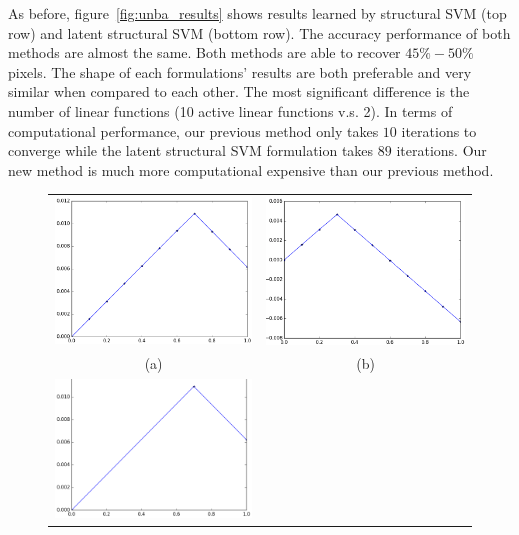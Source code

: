 As before, figure~\ref{fig:unba_results} shows results learned by
structural SVM (top row) and latent structural SVM (bottom row).
The accuracy performance of both methods are almost the same.
Both methods are able to recover $45\%-50\%$ pixels. The shape of
each formulations' results are both preferable and very similar
when compared to each other. The most significant difference is
the number of linear functions (10 active linear functions v.s.
2). In terms of computational performance, our previous method
only takes $10$ iterations to converge while the latent
structural SVM formulation takes $89$ iterations. Our new method
is much more computational expensive than our previous method.

\begin{figure}[ht]
  \centering
  \setlength{\tabcolsep}{2pt}
  \begin{tabular}{cc}
    \includegraphics[width=0.5\columnwidth]{Part2/figures/unba_black_res_old.png}&
                                                                              \includegraphics[width=0.5\columnwidth]{Part2/figures/unba_white_res_old.png}\\
    {\small (a)} & {\small (b)} \\
    \includegraphics[width=0.5\columnwidth]{Part2/figures/unba_black_res_new.png}&

\end{tabular}
\end{figure}
